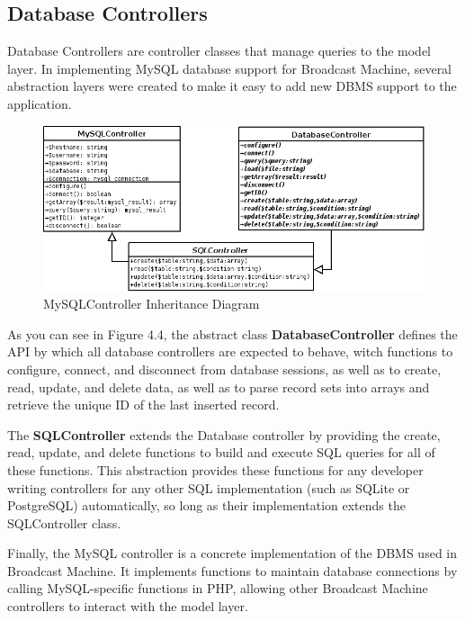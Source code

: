 \documentclass[a4paper,12pt]{report}
\begin{document}
\subsection*{Database Controllers}
Database Controllers are controller classes that manage queries to the model layer. In implementing MySQL database support for Broadcast Machine, several abstraction layers were created to make it easy to add new DBMS support to the application.
\begin{figure}[htp]
\begin{center}
\includegraphics[scale=0.5]{./images/mysql.png}
\end{center}
\caption{MySQLController Inheritance Diagram}
\end{figure}

As you can see in Figure 4.4, the abstract class \textbf{DatabaseController} defines the API by which all database controllers are expected to behave, witch functions to configure, connect, and disconnect from database sessions, as well as to create, read, update, and delete data, as well as to parse record sets into arrays and retrieve the unique ID of the last inserted record.

The \textbf{SQLController} extends the Database controller by providing the create, read, update, and delete functions to build and execute SQL queries for all of these functions. This abstraction provides these functions for any developer writing controllers for any other SQL implementation (such as SQLite or PostgreSQL) automatically, so long as their implementation extends the SQLController class.

Finally, the MySQL controller is a concrete implementation of the DBMS used in Broadcast Machine. It implements functions to maintain database connections by calling MySQL-specific functions in PHP, allowing other Broadcast Machine controllers to interact with the model layer.
\end{document}

